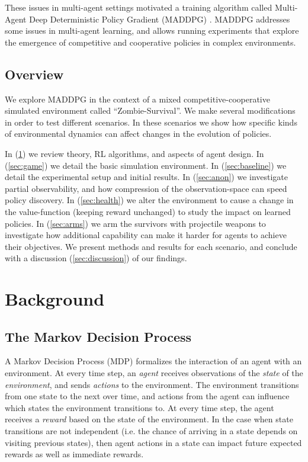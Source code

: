 \documentclass[11pt,a4paper]{article}
\begin{document}
These issues in multi-agent settings motivated a training algorithm called Multi-Agent Deep Deterministic Policy Gradient (MADDPG) \citep{lowe2020multiagent}.
MADDPG addresses some issues in multi-agent learning, and allows running experiments that explore the emergence of competitive and cooperative policies in complex environments.

\subsection{Overview}

We explore MADDPG in the context of a mixed competitive-cooperative simulated environment called ``Zombie-Survival''.
We make several modifications in order to test different scenarios.
In these scenarios we show how specific kinds of environmental dynamics can affect changes in the evolution of policies.

In (\ref{sec:background}) we review theory, RL algorithms, and aspects of agent design.
In (\ref{sec:game}) we detail the basic simulation environment.
In (\ref{sec:baseline}) we detail the experimental setup and initial results.
In (\ref{sec:anon}) we investigate partial observability, and how compression of the observation-space can speed policy discovery.
In (\ref{sec:health}) we alter the environment to cause a change in the value-function (keeping reward unchanged) to study the impact on learned policies.
In (\ref{sec:arms}) we arm the survivors with projectile weapons to investigate how additional capability can make it harder for agents to achieve their objectives.
We present methods and results for each scenario, and conclude with a discussion (\ref{sec:discussion}) of our findings.

\section{Background}
\label{sec:background}

\subsection{The Markov Decision Process}

A Markov Decision Process (MDP) formalizes the interaction of an agent with an environment.
At every time step, an \emph{agent} receives observations of the \emph{state} of the \emph{environment}, and sends \emph{actions} to the environment.
The environment transitions from one state to the next over time, and actions from the agent can influence which states the environment transitions to.
At every time step, the agent receives a \emph{reward} based on the state of the environment.
In the case when state transitions are not independent (i.e. the chance of arriving in a state depends on visiting previous states), then agent actions in a state can impact future expected rewards as well as immediate rewards.
\end{document}
